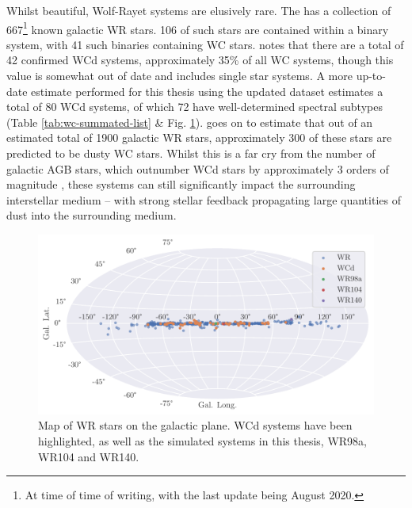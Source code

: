 Whilst beautiful, Wolf-Rayet systems are elusively rare.
The  \parencite{rossloweSpatialDistributionGalactic2015} has a collection of 667\footnote{At time of time of writing, with the last update being August 2020.} known galactic WR stars.
106 of such stars are contained within a binary system, with 41 such binaries containing WC stars.
\textcite{rossloweSpatialDistributionGalactic2015} notes that there are a total of 42 confirmed WCd systems, approximately 35\% of all WC systems, though this value is somewhat out of date and includes single star systems.
A more up-to-date estimate performed for this thesis using the updated dataset estimates a total of 80 WCd systems, of which 72 have well-determined spectral subtypes (Table \ref{tab:wc-summated-list} \& Fig. \ref{fig:wrmap}).
\textcite{rossloweSpatialDistributionGalactic2015} goes on to estimate that out of an estimated total of 1900 galactic WR stars, approximately 300 of these stars are predicted to be dusty WC stars.
Whilst this is a far cry from the number of galactic AGB stars, which outnumber WCd stars by approximately 3 orders of magnitude \parencite{ishiharaGalacticDistributionsCarbon2011}, these systems can still significantly impact the surrounding interstellar medium -- with strong stellar feedback propagating large quantities of dust into the surrounding medium.

\begin{figure}[h]
  \centering
  \includegraphics[width=\linewidth]{assets/galactic.pdf}
  \caption[Map of WR stars on the galactic plane]{Map of WR stars on the galactic plane. WCd systems have been highlighted, as well as the simulated systems in this thesis, WR98a, WR104 and WR140.}
  \label{fig:wrmap}
\end{figure}

